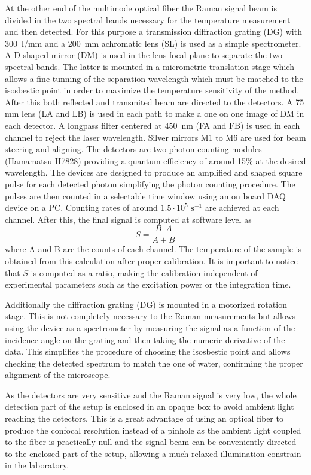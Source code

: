 \documentclass[twocolumn]{svjour3}       %
\begin{document}
At the other end of the multimode optical fiber the Raman signal beam is divided in the two spectral bands necessary for the temperature measurement and then detected. For this purpose a transmission diffraction grating (DG) with 300~l/mm and a 200~mm achromatic lens (SL) is used as a simple spectrometer. A D shaped mirror (DM) is used in the lens focal plane to separate the two spectral bands. The latter is mounted in a micrometric translation stage which allows a fine tunning of the separation wavelength which must be matched to the isosbestic point in order to maximize the temperature sensitivity of the method. After this both reflected and transmited beam are directed to the detectors. A 75 mm lens (LA and LB) is used in each path to make a one on one image of DM in each detector. A longpass filter centered at 450~nm (FA and FB) is used in each channel to reject the laser wavelength. Silver mirrors M1 to M6 are used for beam steering and aligning. The detectors are two photon counting modules (Hamamatsu H7828) providing a quantum efficiency of around 15\% at the desired wavelength. The devices are designed to produce an amplified and shaped square pulse for each detected photon simplifying the photon counting procedure. The pulses are then counted in a selectable time window using an on board DAQ device on a PC. Counting rates of around $1.5 \cdot 10^5 \,\,\mathrm{s}^{-1}$ are achieved at each channel. After this, the final signal is computed at software level as
\begin{equation}\label{eq:S}
S = \frac{B – A}{A + B}
\end{equation}
where A and B are the counts of each channel. The temperature of the sample is obtained from this calculation after proper calibration.  It is important to notice that $S$ is computed as a ratio, making the calibration independent of experimental parameters such as the excitation power or the integration time.

Additionally the diffraction grating (DG) is mounted in a motorized rotation stage.  This is not completely necessary to the Raman measurements but allows using the device as a spectrometer by measuring the signal as a function of the incidence angle on the grating and then taking the numeric derivative of the data. This simplifies the procedure of choosing the isosbestic point and allows checking the detected spectrum to match the one of water, confirming the proper alignment of the microscope. 

As the detectors are very sensitive and the Raman signal is very low, the whole detection part of the setup is enclosed in an opaque box to avoid ambient light reaching the detectors. This is a great advantage of using an optical fiber to produce the confocal resolution instead of a pinhole as the ambient light coupled to the fiber is practically null and the signal beam can be conveniently directed to the enclosed part of the setup, allowing a much relaxed illumination constrain in the laboratory. 
\end{document}
